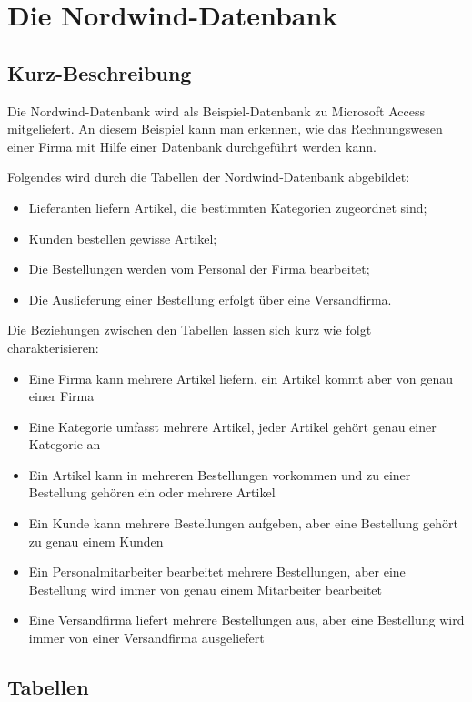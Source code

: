\section*{Die Nordwind-Datenbank}

\subsection*{Kurz-Beschreibung}

Die Nordwind-Datenbank wird als Beispiel-Datenbank zu Microsoft Access mitgeliefert. An diesem Beispiel kann man erkennen, wie das Rechnungswesen einer Firma mit Hilfe einer Datenbank durchgeführt werden kann.

Folgendes wird durch die Tabellen der Nordwind-Datenbank abgebildet:
\begin{itemize}
\item Lieferanten liefern Artikel, die bestimmten Kategorien zugeordnet sind;
\item Kunden bestellen gewisse Artikel;
\item Die Bestellungen werden vom Personal der Firma bearbeitet;
\item Die Auslieferung einer Bestellung erfolgt über eine Versandfirma.
\end{itemize}


Die Beziehungen zwischen den Tabellen lassen sich kurz wie folgt charakterisieren:

\begin{itemize}
\item Eine Firma kann mehrere Artikel liefern, ein Artikel kommt aber von genau einer Firma
\item Eine Kategorie umfasst mehrere Artikel, jeder Artikel gehört genau einer Kategorie an
\item Ein Artikel kann in mehreren Bestellungen vorkommen und zu einer Bestellung gehören ein oder mehrere Artikel
\item Ein Kunde kann mehrere Bestellungen aufgeben, aber eine Bestellung gehört zu genau einem Kunden
\item Ein Personalmitarbeiter bearbeitet mehrere Bestellungen, aber eine Bestellung wird immer von genau einem Mitarbeiter bearbeitet
\item Eine Versandfirma liefert mehrere Bestellungen aus, aber eine Bestellung wird immer von einer Versandfirma ausgeliefert
\end{itemize}

\subsection*{Tabellen}

